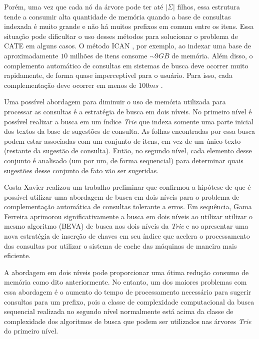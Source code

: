 Porém, uma vez que cada nó da árvore pode ter até $|\Sigma|$ filhos, essa estrutura tende a consumir alta quantidade de memória quando a base de consultas indexada é muito grande e não há muitos prefixos em comum entre os itens. Essa situação pode dificultar o uso desses métodos para solucionar o problema de CATE em alguns casos. O método ICAN \citep{ji2009efficient}, por exemplo, ao indexar uma base de aproximadamente $10$ milhões de itens consome $\sim9GB$ de memória. Além disso, o complemento automático de consultas em sistemas de busca deve ocorrer muito rapidamente, de forma quase imperceptível para o usuário. Para isso, cada complementação deve ocorrer em menos de $100ms$ \citep{ji2009efficient}.

Uma possível abordagem para diminuir o uso de memória utilizada para processar as consultas é a estratégia de busca em dois níveis. No primeiro nível é possível realizar a busca em um índice \textit{Trie} que indexa somente uma parte inicial dos textos da base de sugestões de consulta. As folhas encontradas por essa busca podem estar associadas com um conjunto de itens, em vez de um único texto (restante da sugestão de consulta). Então, no segundo nível, cada elemento desse conjunto é analisado (um por um, de forma sequencial) para determinar quais sugestões desse conjunto de fato vão ser sugeridas. 

Costa Xavier \citep{xavier2019} realizou um trabalho preliminar que confirmou a hipótese de que é possível utilizar uma abordagem de busca em dois níveis para o problema de complementação automática de consultas tolerante a erros. Em sequência, Gama Ferreira \citep{berg2020} aprimorou significativamente a busca em dois níveis ao utilizar utilizar o mesmo algoritmo (BEVA) de busca nos dois níveis da \textit{Trie} e ao apresentar uma nova estratégia de inserção de chaves em seu índice que acelera o processamento das consultas por utilizar o sistema de cache das máquinas de maneira mais eficiente. %

A abordagem em dois níveis pode proporcionar uma ótima redução consumo de memória como dito anteriormente. No entanto, um dos maiores problemas com essa abordagem é o aumento do tempo de processamento necessário para sugerir consultas para um prefixo, pois a classe de complexidade computacional da busca sequencial realizada no segundo nível normalmente está acima da classe de complexidade dos algoritmos de busca que podem ser utilizados nas árvores \textit{Trie} do primeiro nível.

